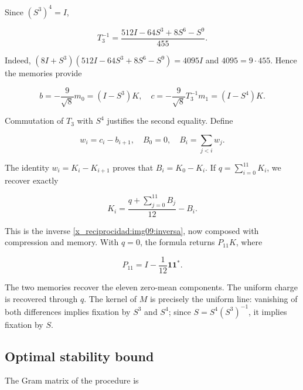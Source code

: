 Since \((S^3)^4=I\),



\begin{equation}
T_3^{-1}=\frac{512I-64S^3+8S^6-S^9}{455}.
\label{x_reciprocidad:nuc11:eq:3}
\end{equation}



Indeed, \((8I+S^3)(512I-64S^3+8S^6-S^9)=4095I\) and \(4095=9\cdot455\). Hence the memories provide



\begin{equation}
b=-\frac9{\sqrt8}m_0=(I-S^3)K,
\quad c=-\frac9{\sqrt8}T_3^{-1}m_1=(I-S^4)K.
\label{x_reciprocidad:nuc11:eq:4}
\end{equation}



Commutation of \(T_3\) with \(S^4\) justifies the second equality. Define



\[
w_i=c_i-b_{i+1},\quad B_0=0,\quad
B_i=\sum_{j<i}w_j.
\]



The identity \(w_i=K_i-K_{i+1}\) proves that \(B_i=K_0-K_i\). If \(q=\sum_{i=0}^{11}K_i\), we recover exactly



\begin{equation}
K_i=\frac{q+\sum_{j=0}^{11}B_j}{12}-B_i.
\label{x_reciprocidad:nuc11:eq:5}
\end{equation}



This is the inverse \eqref{x_reciprocidad:img09:inversa}, now composed with compression and memory. With \(q=0\), the formula returns \(P_{11}K\), where



\[
P_{11}=I-\frac1{12}\mathbf1\mathbf1^*.
\]



The two memories recover the eleven zero-mean components. The uniform charge is recovered through \(q\). The kernel of \(M\) is precisely the uniform line: vanishing of both differences implies fixation by \(S^3\) and \(S^4\); since \(S=S^4(S^3)^{-1}\), it implies fixation by \(S\).

\subsection{Optimal stability bound}

The Gram matrix of the procedure is




